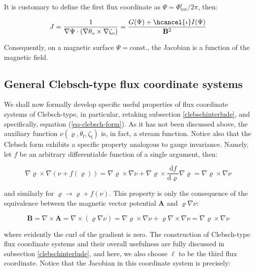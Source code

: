 It is customary to define the first flux coordinate as $\Psi=\Phi_\text{tor}^\text{r}/2\pi$, then:

\begin{equation}
    \label{eq-6-79}
    J=\frac{1}{\nabla\Psi\cdot(\nabla\theta_\text{o}\times\nabla\zeta_\text{o})}=\frac{G(\Psi)+\hcancel{\iota}I(\Psi)}{\mathbf{B}^2}
\end{equation}

Consequently, on a magnetic surface $\Psi=\text{const.}$, the Jacobian is a function of the magnetic field.

\subsection{General Clebsch-type flux coordinate systems}

We shall now formally develop specific useful properties of flux coordinate systems of Clebsch-type, in particular, retaking subsection \ref{clebschinterlude}, and specifically, equation (\ref{eq-clebsch-form}). As it has not been discussed above, the auxiliary function $\nu(\varrho,\theta_\text{f},\zeta_\text{f})$ is, in fact, a stream function. Notice also that the Clebsch form exhibits a specific property analogous to gauge invariance. Namely, let $f$ be an arbitrary differentiable function of a single argument, then:

\begin{equation}
    \nabla\varrho\times\nabla(\nu+f(\varrho))=\nabla\varrho\times\nabla\nu+\nabla\varrho\times\frac{\mathrm{d}f}{\mathrm{d}\varrho}\nabla\varrho=\nabla\varrho\times\nabla\nu
\end{equation}

and similarly for $\varrho\to\varrho+f(\nu)$. This property is only the consequence of the equivalence between the magnetic vector potential $\mathbf{A}$ and $\varrho\nabla\nu$:

\begin{equation}
    \mathbf{B}=\nabla\times\mathbf{A}=\nabla\times(\varrho\nabla\nu)=\nabla\varrho\times\nabla\nu+\varrho\nabla\times\nabla\nu=\nabla\varrho\times\nabla\nu
\end{equation}

where evidently the curl of the gradient is zero. The construction of Clebsch-type flux coordinate systems and their overall usefulness are fully discussed in subsection \ref{clebschinterlude}, and here, we also choose $\ell$ to be the third flux coordinate. Notice that the Jacobian in this coordinate system is precisely:


